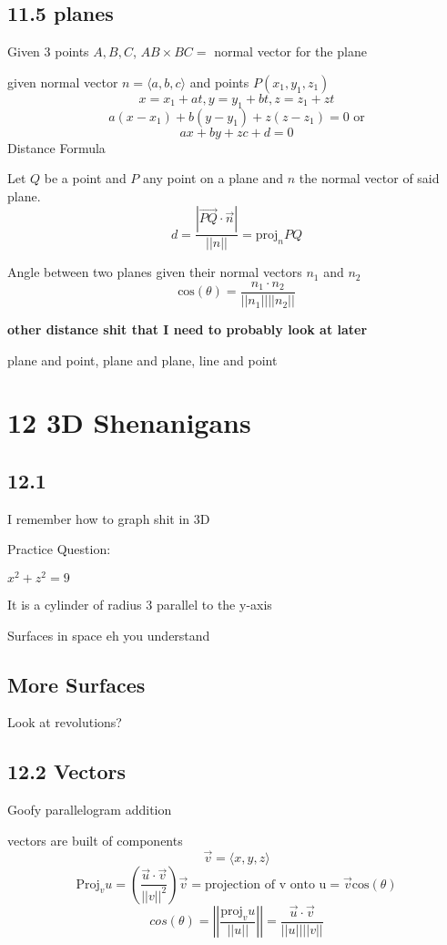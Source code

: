 \documentclass{report}
\begin{document}
\newpage
\section{11.5 planes}
Given 3 points $A, B, C$, $AB \times BC = $ normal vector for the plane

given normal vector $n = \langle a, b, c \rangle$ and points $P(x_1, y_1, z_1)$
$$
x=x_1 + at, y = y_1 + bt, z = z_1 + zt
$$
$$
a(x-x_1) + b(y- y_1) + z(z-z_1) = 0 \text{ or}
$$
$$
ax + by + zc + d = 0
$$
Distance Formula

Let $Q$ be a point and $P$ any point on a plane and $n$ the normal vector of said plane.
$$
d = \frac{|\vec{PQ} \cdot \vec{n}|}{||n||} = \text{proj}_nPQ
$$

Angle between two planes given their normal vectors $n_1$ and $n_2$
$$
\text{cos}(\theta) = \frac{n_1 \cdot n_2}{||n_1|| ||n_2||}
$$

\textbf{other distance shit that I need to probably look at later}

plane and point, plane and plane, line and point

\chapter{12 3D Shenanigans}
\section{12.1}
I remember how to graph shit in 3D

Practice Question:

$x^2 + z^2 = 9$

It is a cylinder of radius 3 parallel to the y-axis

Surfaces in space eh you understand 

\section{More Surfaces}
Look at revolutions?


\section{12.2 Vectors}
Goofy parallelogram addition

vectors are built of components
$$
\vec{v} = \langle x, y, z \rangle
$$
$$
\text{Proj}_vu = \left( \frac{\vec{u} \cdot \vec{v}}{||v||^2} \right)\vec{v} = \text{projection of v onto u} = \vec{v}\text{cos}(\theta)
$$
$$
cos(\theta) =  \left|\left|\frac{\text{proj}_vu}{||u||}\right|\right| = \frac{\vec{u} \cdot \vec{v}}{||u|| ||v||}
$$
\end{document}
